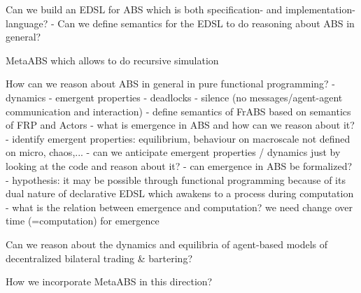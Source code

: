 Can we build an EDSL for ABS which is both specification- and implementation-language? 
	- Can we define semantics for the EDSL to do reasoning about ABS in general?

MetaABS which allows to do recursive simulation

How can we reason about ABS in general in pure functional programming?
	- dynamics
	- emergent properties
	- deadlocks
	- silence (no messages/agent-agent communication and interaction)
	- define semantics of FrABS based on semantics of FRP and Actors
	- what is emergence in ABS and how can we reason about it? 
		- identify emergent properties: equilibrium, behaviour on macroscale not defined on micro, chaos,...
		- can we anticipate emergent properties / dynamics just by looking at the code and reason about it?
		- can emergence in ABS be formalized?
			- hypothesis: it may be possible through functional programming because of its dual nature of declarative EDSL which awakens to a process during computation
				- what is the relation between emergence and computation? we need change over time (=computation) for emergence
				
Can we reason about the dynamics and equilibria of agent-based models of decentralized bilateral trading \& bartering?

How we incorporate MetaABS in this direction?